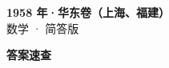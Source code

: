 \documentclass[zihao=-4, a4paper]{ctexart}
\begin{document}
\begin{center}
  {\Large\bfseries 1958 年·华东卷（上海、福建）}\\[4pt]
  {\large 数学 · 简答版}
\end{center}
\medskip
{}

\clearpage
{}
\begin{center}{\Large\bfseries 答案速查}\end{center}
\medskip

\end{document}
